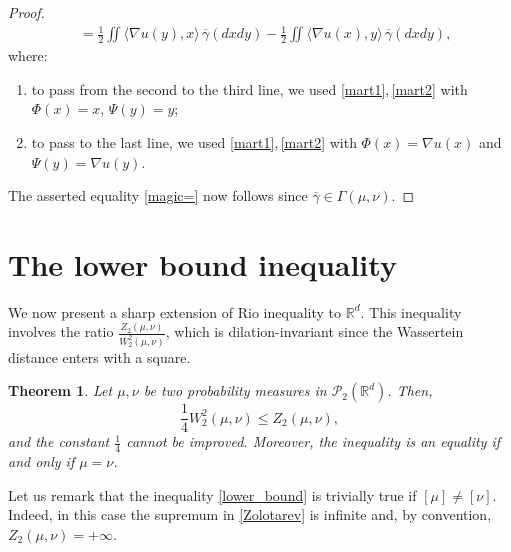 \documentclass[11pt,reqno]{amsart}
\newtheorem{theorem}{Theorem}[section]
\theoremstyle{definition}
\numberwithin{equation}{section}
\newcommand{\R}{\mathbb{R}}
\newcommand{\Rd}{{\R^d}}
\newcommand{\ov}{\overline}
\def\dis{\displaystyle}
\begin{document}
\begin{proof}
\begin{align*}
    	& =  \frac{1}{2 } \iint \big\langle \nabla u(y),x \big\rangle  \, \ov\gamma(dxdy)  - \frac{1}{2 } \iint \big\langle \nabla u(x), y \big\rangle  \, \ov\gamma(dxdy) ,
    \end{align*}
    where:
    \begin{enumerate}
    \item[-] to pass from the second to the third line, we used
     \eqref{mart1},\,\eqref{mart2}  with $\Phi(x) = x$, $\Psi(y) = y$;
     \item[-] to pass to the last line, we used \eqref{mart1},\,\eqref{mart2}  with $\Phi(x) = \nabla u(x)$ and $\Psi(y) = \nabla u(y)$.
       \end{enumerate} 
    The asserted equality \eqref{magic=} now follows since $\ov\gamma \in \Gamma(\mu,\nu)$.
\end{proof}






\section{The lower bound inequality}

We  now present a sharp extension of Rio inequality to $\R^d$. This inequality  involves the ratio  $\dis \tfrac{Z_2(\mu,\nu)}{W_2^2(\mu,\nu)}$,
which is  dilation-invariant since the Wassertein distance enters with a square.
\begin{theorem}    \label{main}
    Let  $\mu,\nu$ be two probability measures in  $\mathcal{P}_2(\Rd)$. Then,
	\begin{equation}
		\label{lower_bound}
		\frac{1}{4} W_2^2(\mu,\nu)  \leq  Z_2(\mu,\nu),
	\end{equation}
	and the constant $\frac{1}{4}$  cannot be improved. Moreover, the inequality is an equality if and only if $\mu = \nu$. 
\end{theorem}

Let us remark that the inequality \eqref{lower_bound} is trivially true if $[\mu]\not=[\nu]$. Indeed, in this case the supremum in  
\eqref{Zolotarev} is infinite and, by convention, $Z_2(\mu,\nu)=+\infty.$
\end{document}
